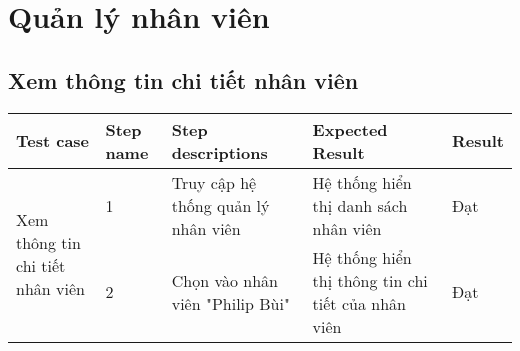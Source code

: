 \section{Quản lý nhân viên}
\subsection{ Xem thông tin chi tiết nhân viên}
{
    \setlength\extrarowheight{6pt}
    \begin{longtable}{| p{2.5cm}| p{1cm}| p{5.5cm}| p{4.5cm} | p{1.5cm} |}
        \hline
        \textbf{Test case} & \textbf{Step name} & \textbf{Step descriptions} & \textbf{Expected Result} & \textbf{Result} \\
        \hline
        \multirow[t]{2}{2.5cm}{ Xem thông tin chi tiết nhân viên} & 1 & Truy cập hệ thống quản lý nhân viên & Hệ thống hiển thị danh sách nhân viên & Đạt \\
        \cline{2-5}
         & 2 & Chọn vào nhân viên "Philip Bùi" & Hệ thống hiển thị thông tin chi tiết của nhân viên & Đạt \\
         \hline
    \end{longtable}
}

